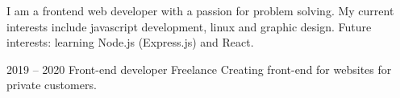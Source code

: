 \documentclass[9pt]{developercv} %
\begin{document}
\vspace{0.5cm}



\begin{minipage}[t]{0.4\textwidth} %
	\vspace{-\baselineskip} %
	
	I am a frontend web developer with a passion for problem solving. 
  My current interests include javascript development, linux and graphic design. 
  Future interests: learning Node.js (Express.js) and React.
\end{minipage}
\hfill %
\begin{minipage}[t]{0.5\textwidth} %
	\vspace{-\baselineskip} %
	\begin{barchart}{5.5}
	\end{barchart}
\end{minipage}


\begin{entrylist}
  \entry
      {2019 -- 2020}
      {Front-end developer}
      {Freelance}
      {Creating front-end for websites for private customers.}
\end{entrylist}
\end{document}
